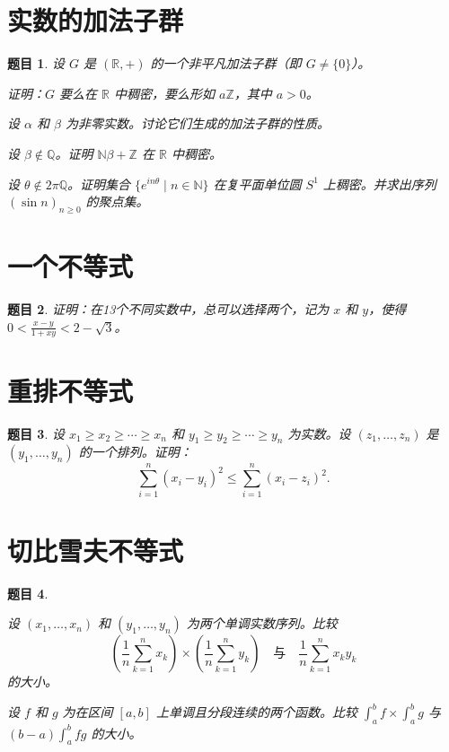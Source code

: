 \documentclass[12pt,UTF8]{ctexbook}
\theoremstyle{exercisestyle}
\newtheorem*{exercise}{题目}
\theoremstyle{solutionstyle}
\begin{document}
\section{实数的加法子群}
\begin{exercise}
  设 \(G\) 是 \((\mathbb{R}, +)\) 的一个非平凡加法子群（即 \(G \neq \{0\}\)）。  
  \begin{subquestions}
    \item 证明：\(G\) 要么在 \(\mathbb{R}\) 中稠密，要么形如 \(a\mathbb{Z}\)，其中 \(a > 0\)。
    \item 设 \(\alpha\) 和 \(\beta\) 为非零实数。讨论它们生成的加法子群的性质。
    \item 设 \(\beta \notin \mathbb{Q}\)。证明 \(\mathbb{N}\beta + \mathbb{Z}\) 在 \(\mathbb{R}\) 中稠密。
    \item 设 \(\theta \notin 2\pi\mathbb{Q}\)。证明集合 \(\{e^{in\theta} \mid n \in \mathbb{N}\}\) 在复平面单位圆 \(S^1\) 上稠密。并求出序列 \((\sin n)_{n\geqslant 0}\) 的聚点集。
  \end{subquestions}
\end{exercise}

\section{一个不等式}
\begin{exercise}
  证明：在13个不同实数中，总可以选择两个，记为 \(x\) 和 \(y\)，使得 \(0 < \frac{x-y}{1+xy} < 2-\sqrt{3}\)。
\end{exercise}

\section{重排不等式}
\begin{exercise}
设 \(x_1 \geqslant x_2 \geqslant \cdots \geqslant x_n\) 和 \(y_1 \geqslant y_2 \geqslant \cdots \geqslant y_n\) 为实数。设 \((z_1, \ldots, z_n)\) 是 \((y_1, \ldots, y_n)\) 的一个排列。证明：
\[
\sum_{i=1}^{n} (x_i - y_i)^2 \leqslant \sum_{i=1}^{n} (x_i - z_i)^2.
\]
\end{exercise}

\section{切比雪夫不等式}
\begin{exercise}
  \begin{subquestions}
    \item 设 \((x_1, \ldots, x_n)\) 和 \((y_1, \ldots, y_n)\) 为两个单调实数序列。比较
    \[
    \left(\frac{1}{n}\sum_{k=1}^n x_k\right) \times \left(\frac{1}{n}\sum_{k=1}^n y_k\right)
    \quad \mbox{与} \quad 
    \frac{1}{n}\sum_{k=1}^n x_k y_k
    \]
    的大小。
    \item 设 \(f\) 和 \(g\) 为在区间 \([a, b]\) 上单调且分段连续的两个函数。比较 \(\int_a^b f \times \int_a^b g\) 与 \((b-a) \int_a^b fg\) 的大小。
  \end{subquestions}
\end{exercise}
\end{document}

